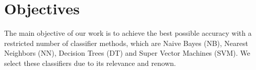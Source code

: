 \section{Objectives}
The main objective of our work is to achieve the best possible accuracy with a restricted number of classifier methods, which are Naive Bayes (NB), Nearest Neighbors (NN), Decision Trees (DT) and Super Vector Machines (SVM). We select these classifiers due to its relevance and renown. 